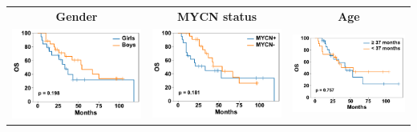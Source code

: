 \begin{tabular}{ccc}
\textbf{Gender}
&
\textbf{MYCN status}
&
\textbf{Age}
\\[1ex]
\includegraphics[width=\coll]{sex}
&
\includegraphics[width=\coll]{Nmyc}
&
\includegraphics[width=\coll]{age_percentiles/50}

\end{tabular}
